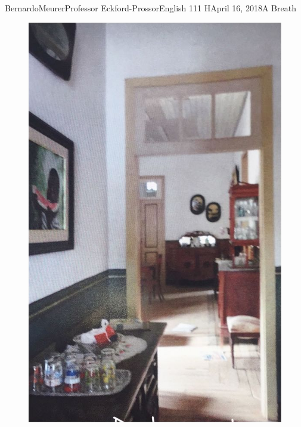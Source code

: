 \documentclass[12pt,letterpaper]{article}
\begin{document}
\begin{mla}{Bernardo}{Meurer}{Professor Eckford-Prossor}{English 111 H}{April 16, 2018}{A Breath}
\begin{figure}
\begin{minipage}{.5\textwidth}
			\includegraphics[width=\linewidth]{hall.jpeg}
		\end{minipage}%
		\begin{minipage}{.5\textwidth}
			\centering

\end{minipage}
\end{figure}
\end{mla}
\end{document}
